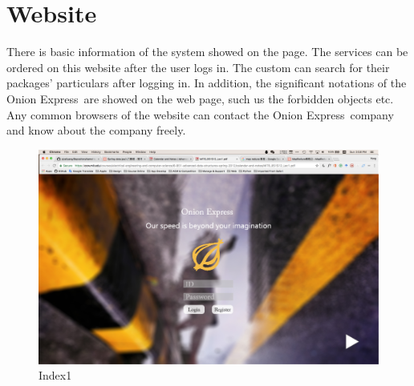 \documentclass[12pt]{scrreprt}
\begin{document}
\section{Website}
There is basic information of the system showed on the page. The services can
be ordered on this website after the user logs in. The custom can search for
their packages' particulars after logging in. In addition, the significant
notations of the Onion Express\textregistered\ are showed on the web page, such us the forbidden 
objects etc. Any common browsers of the website can contact the Onion
Express\textregistered\ company and know about the company freely.
\begin{figure}[htbp]
  \centering\includegraphics[width=6in]{DocumentRes/index1.png}
  \caption{Index1}
\end{figure}
\end{document}
